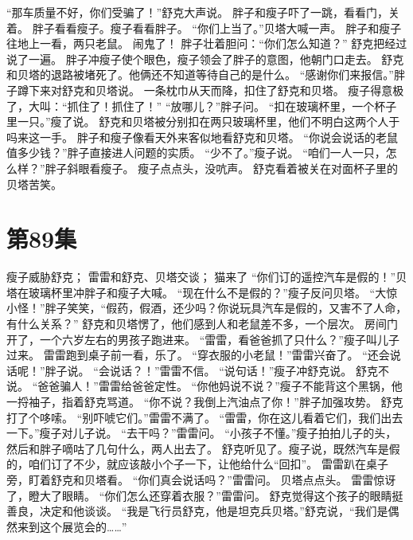 \documentclass[a4paper,12pt,UTF8,twoside]{ctexbook}
\begin{document}
        “那车质量不好，你们受骗了！”舒克大声说。 
        胖子和瘦子吓了一跳，看看门，关着。 
        胖子看看瘦子。瘦子看看胖子。 
        “你们上当了。”贝塔大喊一声。 
        胖子和瘦子往地上一看，两只老鼠。 
        闹鬼了！ 
        胖子壮着胆问：“你们怎么知道？” 
        舒克把经过说了一遍。 
        胖子冲瘦子使个眼色，瘦子领会了胖子的意图，他朝门口走去。 
        舒克和贝塔的退路被堵死了。他俩还不知道等待自己的是什么。 
        “感谢你们来报信。”胖子蹲下来对舒克和贝塔说。 
        一条枕巾从天而降，扣住了舒克和贝塔。 
        瘦子得意极了，大叫：“抓住了！抓住了！” 
        “放哪儿？”胖子问。 
        “扣在玻璃杯里，一个杯子里一只。”瘦了说。 
        舒克和贝塔被分别扣在两只玻璃杯里，他们不明白这两个人于吗来这一手。 
        胖子和瘦子像看天外来客似地看舒克和贝塔。 
        “你说会说话的老鼠值多少钱？”胖子直接进人问题的实质。 
        “少不了。”瘦子说。 
        “咱们一人一只，怎么样？”胖子斜眼看瘦子。 
        瘦子点点头，没吭声。 
        舒克看着被关在对面杯子里的贝塔苦笑。       \chapter{第89集} 
        瘦子威胁舒克； 
        雷雷和舒克、贝塔交谈； 
        猫来了   
        “你们订的遥控汽车是假的！”贝塔在玻璃杯里冲胖子和瘦子大喊。 
        “现在什么不是假的？”瘦子反问贝塔。 
        “大惊小怪！”胖子笑笑，“假药，假酒，还少吗？你说玩具汽车是假的，又害不了人命，有什么关系？” 
        舒克和贝塔愣了，他们感到人和老鼠差不多，一个层次。 
        房间门开了，一个六岁左右的男孩子跑进来。 
        “雷雷，看爸爸抓了只什么？”瘦子叫儿子过来。 
        雷雷跑到桌子前一看，乐了。 
        “穿衣服的小老鼠！”雷雷兴奋了。 
        “还会说话呢！”胖子说。 
        “会说话？！”雷雷不信。 
        “说句话！”瘦子冲舒克说。 
        舒克不说。 
        “爸爸骗人！”雷雷给爸爸定性。 
        “你他妈说不说？”瘦子不能背这个黑锅，他一捋袖子，指着舒克骂道。 
        “你不说？我倒上汽油点了你！”胖子加强攻势。 
        舒克打了个哆嗦。 
        “别吓唬它们。”雷雷不满了。 
        “雷雷，你在这儿看着它们，我们出去一下。”瘦子对儿子说。 
        “去干吗？”雷雷问。 
        “小孩子不懂。”瘦子拍拍儿子的头，然后和胖子嘀咕了几句什么，两人出去了。 
        舒克听见了。瘦子说，既然汽车是假的，咱们订了不少，就应该敲小个子一下，让他给什么“回扣”。 
        雷雷趴在桌子旁，盯着舒克和贝塔看。 
        “你们真会说话吗？”雷雷问。 
        贝塔点点头。 
        雷雷惊讶了，瞪大了眼睛。 
        “你们怎么还穿着衣服？”雷雷问。 
        舒克觉得这个孩子的眼睛挺善良，决定和他谈谈。 
        “我是飞行员舒克，他是坦克兵贝塔。”舒克说，“我们是偶然来到这个展览会的……” 
\end{document}
